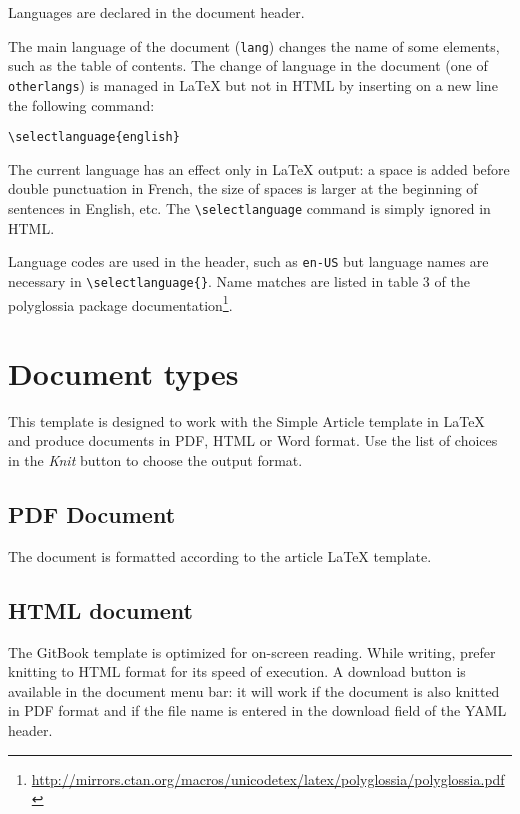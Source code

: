 \documentclass[fleqn,]{article} %
\begin{document}
Languages are declared in the document header.

The main language of the document (\texttt{lang}) changes the name of some elements, such as the table of contents.
The change of language in the document (one of \texttt{otherlangs}) is managed in LaTeX but not in HTML by inserting on a new line the following command:

\begin{verbatim}
\selectlanguage{english}
\end{verbatim}

The current language has an effect only in LaTeX output: a space is added before double punctuation in French, the size of spaces is larger at the beginning of sentences in English, etc.
The \texttt{\textbackslash{}selectlanguage} command is simply ignored in HTML.

Language codes are used in the header, such as \texttt{en-US} but language names are necessary in \texttt{\textbackslash{}selectlanguage\{\}}.
Name matches are listed in table 3 of the polyglossia package documentation\footnote{\url{http://mirrors.ctan.org/macros/unicodetex/latex/polyglossia/polyglossia.pdf}}.

\section{Document types}\label{document-types}

This template is designed to work with the Simple Article template in LaTeX and produce documents in PDF, HTML or Word format.
Use the list of choices in the \emph{Knit} button to choose the output format.

\subsection{PDF Document}\label{pdf-document}

The document is formatted according to the article LaTeX template.

\subsection{HTML document}\label{html-document}

The GitBook template is optimized for on-screen reading.
While writing, prefer knitting to HTML format for its speed of execution.
A download button is available in the document menu bar: it will work if the document is also knitted in PDF format and if the file name is entered in the download field of the YAML header.
\end{document}
